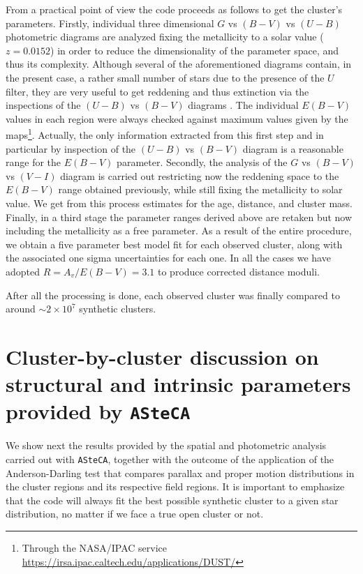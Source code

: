\documentclass[draft]{aa}
\begin{document}
From a practical point of view the code proceeds as follows to get the
cluster's parameters. Firstly, individual three dimensional $G$ vs $(B-V)$ vs $
(U-B)$ photometric diagrams are analyzed fixing the metallicity to a solar
value ($z = 0.0152$) in order to reduce the dimensionality of the parameter
space, and thus its complexity. Although several of the aforementioned diagrams
contain, in the present case, a rather small number of stars due to the
presence of the $U$ filter, they are very useful to get reddening and thus
extinction via the inspections of the $(U-B)$ vs $(B-V)$ diagrams
\citep{Vazquez2008} .
The individual $E(B-V)$ values in each region were always checked against
maximum values given by the \cite{Schlafly_2011} maps\footnote{Through the
NASA/IPAC service \url{https://irsa.ipac.caltech.edu/applications/DUST/}}.
Actually, the only information extracted from this first step and in particular
by inspection of the $(U-B)$ vs $(B-V)$ diagram is a reasonable range for
the $E(B-V)$ parameter.
%
Secondly, the analysis of the $G$ vs $(B-V)$ vs $(V-I)$ diagram is carried out
restricting now the reddening space to the $E(B-V)$ range obtained previously,
while still fixing the metallicity to solar value. We get from this process
estimates for the age, distance, and cluster mass.
%
Finally, in a third stage the parameter ranges derived above are retaken but
now including the metallicity as a free parameter. As a result of the entire
procedure, we obtain a five parameter best model fit for each observed cluster,
along with the associated one sigma uncertainties for each one. In all the
cases we have adopted $R=A_v/E(B-V) = 3.1$ to produce corrected distance moduli.

After all the processing is done, each observed cluster was finally compared to
around $\sim2\times10^7$ synthetic clusters.



\section{Cluster-by-cluster discussion on structural and intrinsic parameters
provided by \texttt{ASteCA}}
\label{sec:cluster_discuss}

We show next the results provided by the spatial and photometric analysis
carried out with \texttt{ASteCA}, together with the outcome of the application
of the Anderson-Darling test that compares parallax and proper motion
distributions in the cluster regions and its respective field regions.
It is important to emphasize that the code will always fit the
best possible synthetic cluster to a given star distribution, no matter if we
face a true open cluster or not.
\end{document}
